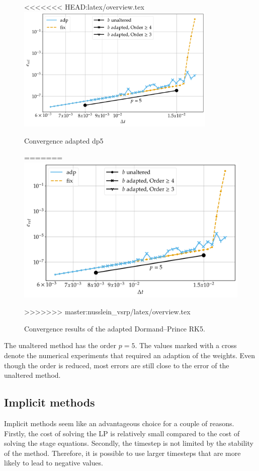 \documentclass[a4paper]{article}
\numberwithin{equation}{section}
\theoremstyle{plain}
\theoremstyle{definition}
\numberwithin{theorem}{section}
\newcommand{\1}{\mathbbm{1}}
\begin{document}
\begin{figure}[ht]
\centering
<<<<<<< HEAD:latex/overview.tex
\includegraphics[width=0.85\textwidth]{plots/conv_adde.pdf}
\caption{Convergence adapted dp5}
=======
\includegraphics[scale=0.6]{plots/conv_adde.pdf}
\caption{Convergence results of the adapted Dormand--Prince RK5.}
>>>>>>> master:nusslein_vsrp/latex/overview.tex
\label{fig:conv_expl}
\end{figure}

The unaltered method has the order $p=5$. 
The values marked with a cross denote the numerical experiments that required an adaption of the weights. 
Even though the order is reduced, most errors are still close to the error of the unaltered method.

\subsection{Implicit methods}
Implicit methods seem like an advantageous choice for a couple of reasons. 
Firstly, the cost of solving the LP is relatively small compared to the cost of solving the stage equations.
Secondly, the timestep is not limited by the stability of the method.
Therefore, it is possible to use larger timesteps that are more likely to lead to negative values.
\end{document}

